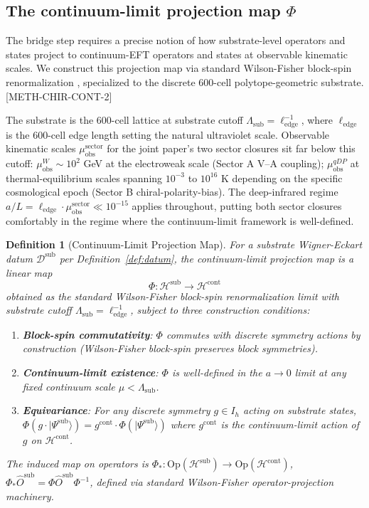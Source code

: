 \documentclass[11pt,letterpaper]{article}
\newtheorem{definition}[theorem]{Definition}
\newcommand{\Phicont}{\Phi_*}
\newcommand{\Lambdasub}{\Lambda_{\text{sub}}}
\newcommand{\muobs}{\mu_{\text{obs}}}
\newcommand{\elledge}{\ell_{\text{edge}}}
\newcommand{\methref}[1]{\textsf{\small[\textsc{#1}]}}
\begin{document}
\subsection{The continuum-limit projection map $\Phi$}
\label{sec:projection_map}

The bridge step requires a precise notion of how substrate-level operators and states project to continuum-EFT operators and states at observable kinematic scales. We construct this projection map via standard Wilson-Fisher block-spin renormalization \cite{WilsonKogut, KadanoffBlock}, specialized to the discrete 600-cell polytope-geometric substrate. \methref{METH-CHIR-CONT-2}

The substrate is the 600-cell lattice at substrate cutoff $\Lambdasub = \elledge^{-1}$, where $\elledge$ is the 600-cell edge length setting the natural ultraviolet scale. Observable kinematic scales $\muobs^{\text{sector}}$ for the joint paper's two sector closures sit far below this cutoff: $\muobs^W \sim 10^2$ GeV at the electroweak scale (Sector A V--A coupling); $\muobs^{qDP}$ at thermal-equilibrium scales spanning $10^{-3}$ to $10^{16}$ K depending on the specific cosmological epoch (Sector B chiral-polarity-bias). The deep-infrared regime $a/L = \elledge \cdot \muobs^{\text{sector}} \ll 10^{-15}$ applies throughout, putting both sector closures comfortably in the regime where the continuum-limit framework is well-defined.

\begin{definition}[Continuum-Limit Projection Map]
\label{def:projection_map}
For a substrate Wigner-Eckart datum $\mathcal{D}^{\text{sub}}$ per Definition~\ref{def:datum}, the \emph{continuum-limit projection map} is a linear map
\begin{equation}
\Phi: \mathcal{H}^{\text{sub}} \to \mathcal{H}^{\text{cont}}
\label{eq:projection_map}
\end{equation}
obtained as the standard Wilson-Fisher block-spin renormalization limit \cite{WilsonKogut, KadanoffBlock} with substrate cutoff $\Lambdasub = \elledge^{-1}$, subject to three construction conditions:
\begin{enumerate}[leftmargin=*]
\item \textbf{Block-spin commutativity}: $\Phi$ commutes with discrete symmetry actions by construction (Wilson-Fisher block-spin preserves block symmetries).
\item \textbf{Continuum-limit existence}: $\Phi$ is well-defined in the $a \to 0$ limit at any fixed continuum scale $\mu < \Lambdasub$.
\item \textbf{Equivariance}: For any discrete symmetry $g \in I_h$ acting on substrate states, $\Phi(g \cdot |\Psi^{\text{sub}}\rangle) = g^{\text{cont}} \cdot \Phi(|\Psi^{\text{sub}}\rangle)$ where $g^{\text{cont}}$ is the continuum-limit action of $g$ on $\mathcal{H}^{\text{cont}}$.
\end{enumerate}
The induced map on operators is $\Phicont: \text{Op}(\mathcal{H}^{\text{sub}}) \to \text{Op}(\mathcal{H}^{\text{cont}})$, $\Phicont\hat{O}^{\text{sub}} = \Phi \hat{O}^{\text{sub}} \Phi^{-1}$, defined via standard Wilson-Fisher operator-projection machinery.
\end{definition}
\end{document}
